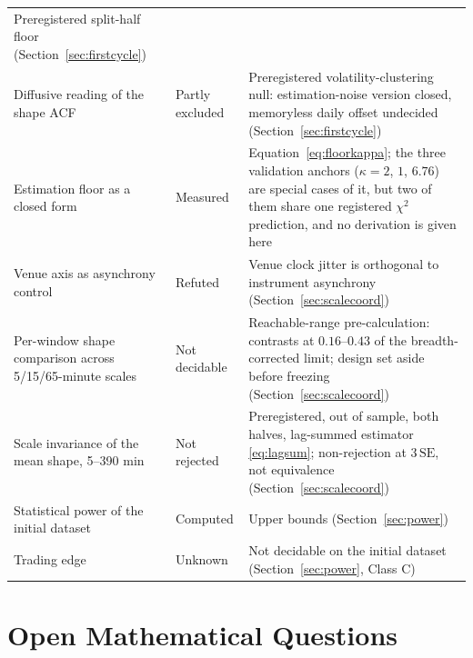 \documentclass[11pt,a4paper]{article}
\numberwithin{equation}{section}
\begin{document}
\begin{center}
\begin{tabular}{p{}p{}p{}}
  Preregistered split-half floor
  (Section~\ref{sec:firstcycle})\\
Diffusive reading of the shape ACF & Partly excluded &
  Preregistered volatility-clustering null: estimation-noise
  version closed, memoryless daily offset undecided
  (Section~\ref{sec:firstcycle})\\
Estimation floor as a closed form & Measured &
  Equation~\eqref{eq:floorkappa}; the three validation anchors
  ($\kappa = 2$, $1$, $6.76$) are special cases of it, but two of
  them share one registered $\chi^2$ prediction, and no derivation
  is given here\\
Venue axis as asynchrony control & Refuted &
  Venue clock jitter is orthogonal to instrument asynchrony
  (Section~\ref{sec:scalecoord})\\
Per-window shape comparison across 5/15/65-minute scales &
  Not decidable &
  Reachable-range pre-calculation: contrasts at $0.16$--$0.43$ of
  the breadth-corrected limit; design set aside before freezing
  (Section~\ref{sec:scalecoord})\\
Scale invariance of the mean shape, 5--390 min & Not rejected &
  Preregistered, out of sample, both halves, lag-summed
  estimator \eqref{eq:lagsum}; non-rejection at $3\,\mathrm{SE}$,
  not equivalence (Section~\ref{sec:scalecoord})\\
Statistical power of the initial dataset & Computed &
  Upper bounds (Section~\ref{sec:power})\\
Trading edge & Unknown &
  Not decidable on the initial dataset
  (Section~\ref{sec:power}, Class C)\\
\bottomrule
\end{tabular}
\end{center}

\section{Open Mathematical Questions}
\end{document}
